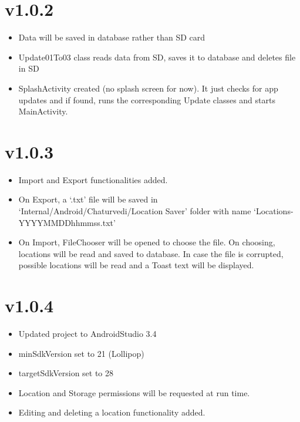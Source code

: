 \documentclass{article}
\begin{document}
\section{v1.0.2}
\begin{itemize}
\item Data will be saved in database rather than SD card
\item Update01To03 class reads data from SD, saves it to database and deletes file in SD
\item SplashActivity created (no splash screen for now). It just checks for app updates and if found, runs the corresponding Update classes and starts MainActivity.
\end{itemize}

\section{v1.0.3}
\begin{itemize}
\item Import and Export functionalities added.
\item On Export, a `.txt' file will be saved in `Internal/Android/Chaturvedi/Location Saver' folder with name `Locations-YYYYMMDDhhmmss.txt'
\item On Import, FileChooser will be opened to choose the file. On choosing, locations will be read and saved to database. In case the file is corrupted, possible locations will be read and a Toast text will be displayed.
\end{itemize}

\section{v1.0.4}
\begin{itemize}
\item Updated project to AndroidStudio 3.4
\item minSdkVersion set to 21 (Lollipop)
\item targetSdkVersion set to 28
\item Location and Storage permissions will be requested at run time.
\item Editing and deleting a location functionality added.
\end{itemize}
\end{document}
